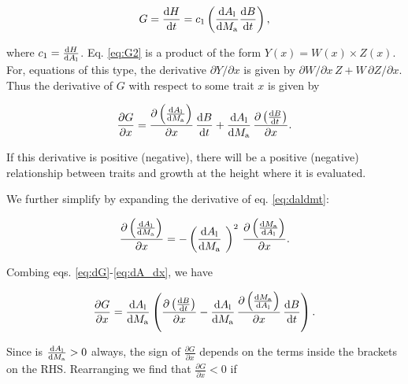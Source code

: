 \documentclass[12pt, a4paper]{article}
\begin{document}
\begin{appendices}
\begin{equation} \label{eq:G2}
G = \frac{{\rm d}H}{{\rm d}t} = c_1   \left(\frac{{\rm d}A_{\rm l}} {{\rm d}M_{\rm a}}  \frac{ {\rm d}B} {{\rm d}t} \right),
\end{equation}

where $c_1 = \frac{{\rm d}H}{{\rm d}A_{\rm l}}$. Eq.
\ref{eq:G2} is a product of the form $Y(x) = W(x) \times Z(x)$. For,
equations of this type, the derivative $\partial{Y}/\partial{x}$ is
given by $\partial{W}/\partial{x} \, Z + W \, \partial{Z}/\partial{x}$. Thus
the derivative of $G$ with respect to some trait $x$  is given by

\begin{equation} \label{eq:dG}
\frac{\partial G} {\partial x} =
\frac{\partial \left(\frac{{\rm d}A_{\rm l}} {{\rm d}M_{\rm a}}\right)}{\partial x}
 \, \frac{ {\rm d}B} {{\rm d}t}
+ \frac{{\rm d}A_{\rm l}} {{\rm d}M_{\rm a}}
\, \frac{\partial \left( \frac{ {\rm d}B} {{\rm d}t}\right)}{\partial x}.
\end{equation}

If this derivative is positive (negative), there will be a positive (negative) relationship
between traits and growth at the height where it is evaluated.

We further simplify by expanding the derivative of eq. \ref{eq:daldmt}:

\begin{equation} \label{eq:dA_dx}
\frac{\partial \left(\frac{{\rm d}A_{\rm l}} {{\rm d}M_{\rm a}}\right)}
{\partial x} = -\left(\frac{{\rm d}A_{\rm l}} {{\rm d}M_{\rm a}}\ \right)^2
\, \frac{\partial \left(\frac{{\rm d}M_{\rm a}} {{\rm d}A_{\rm l}}\right)
}{\partial x}.
\end{equation}

Combing eqs. \ref{eq:dG}-\ref{eq:dA_dx}, we have

\begin{equation} \label{eq:dG2}
\frac{\partial G} {\partial x} =
\frac{{\rm d}A_{\rm l}} {{\rm d}M_{\rm a}}
\left(
\frac{\partial \left( \frac{ {\rm d}B} {{\rm d}t}\right)}{\partial x}
- \frac{{\rm d}A_{\rm l}} {{\rm d}M_{\rm a}}
\,  \frac{\partial \left(\frac{{\rm d}M_{\rm a}} {{\rm d}A_{\rm l}}\right)
}{\partial x}
 \, \frac{ {\rm d}B} {{\rm d}t}
\right).
\end{equation}

Since is $\frac{{\rm d}A_{\rm l}} {{\rm d}M_{\rm a}}>0$ always, the sign
of $\frac{\partial G} {\partial x}$ depends on the terms inside the brackets on the
RHS. Rearranging we find that $\frac
{\partial G} {\partial x} < 0$ if


\end{appendices}
\end{document}
